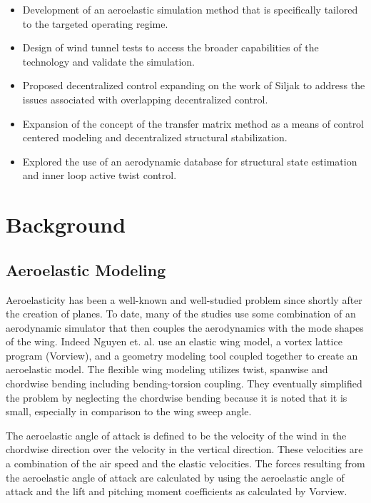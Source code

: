 \documentclass[11pt]{ucthesis}
\begin{document}
\begin{itemize}
\item Development of an aeroelastic simulation method that is specifically tailored to the targeted operating regime. 
\item Design of wind tunnel tests to access the broader capabilities of the technology and validate the simulation.
\item Proposed decentralized control expanding on the work of Siljak \cite{siljak2011decentralized} to address the issues associated with overlapping decentralized control.
\item Expansion of the concept of the transfer matrix method as a means of control centered modeling and decentralized structural stabilization.
\item Explored the use of an aerodynamic database for structural state estimation and inner loop active twist control.
\end{itemize}

\chapter{Background}
\section{Aeroelastic Modeling}
\label{sec:aeroMoldLit}

Aeroelasticity has been a well-known and well-studied problem since shortly after the creation of planes.   To date, many of the studies use some combination of an aerodynamic simulator that then couples the aerodynamics with the mode shapes of the wing. Indeed Nguyen et. al. \cite{nguyencoupled} use an elastic wing model, a vortex lattice program (Vorview), and a geometry modeling tool coupled together to create an aeroelastic model. The flexible wing modeling utilizes twist, spanwise and chordwise bending including bending-torsion coupling. They eventually simplified the problem by neglecting the chordwise bending because it is noted that it is small, especially in comparison to the wing sweep angle.

The aeroelastic angle of attack is defined to be the velocity of the wind in the chordwise direction over the velocity in the vertical direction. These velocities are a combination of the air speed and the elastic velocities. The forces resulting from the aeroelastic angle of attack are calculated by using the aeroelastic angle of attack and the lift and pitching moment coefficients as calculated by Vorview.
\end{document}
